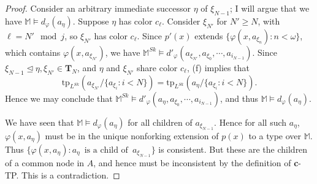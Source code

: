 \documentclass[10pt,a4paper]{amsart}
\newcommand{\bbM}{\mathbb{M}}
\newcommand{\tp}{\text{tp}}
\newcommand{\vphi}{\varphi}
\begin{document}
\begin{proof}
    Consider an arbitrary immediate successor $\eta$ of $\xi_{N-1}$; I will argue that we have $\bbM\models d_\vphi (a_\eta)$. Suppose $\eta$ has color $c_\ell$. Consider $\xi_{N'}$ for $N'\geq N$, with $\ell=N'\mod j$, so $\xi_{N'}$ has color $c_\ell$. Since $p'(x)$ extends $\{\vphi(x, a_{\xi_n})\colon n<\omega\}$, which contains $\vphi(x, a_{\xi_{N'}})$, we have $\bbM^{Sk}\models d'_\vphi(a_{\xi_{N'}},a_{\xi_0},\dotsm, a_{i_{N-1}})$. Since $\xi_{N-1}\trianglelefteq \eta, \xi_{N'}\in \textbf{T}_N$, and $\eta$ and $\xi_{N'}$ share color $c_\ell$, (f) implies that $$\tp_{L^{Sk}}(a_{\xi_{N'}}/\{a_{\xi_i}\colon i<N\})=\tp_{L^{Sk}}(a_{\eta}/\{a_{\xi_i}\colon i<N\}).$$
    Hence we may conclude that $\bbM^{Sk}\models d'_\vphi(a_\eta,a_{\xi_0},\dotsm, a_{i_{N-1}})$, and thus $\bbM\models d_\vphi(a_\eta)$. 
    

    We have seen that $\bbM\models d_\vphi(a_\eta)$ for all children of $a_{\xi_{N-1}}$. Hence for all such $a_\eta$, $\vphi(x,a_\eta)$ must be in the unique nonforking extension of $p(x)$ to a type over $\bbM$. Thus $\{\vphi(x, a_\eta)\colon a_\eta\enspace\text{is a child of}\enspace a_{\xi_{N-1}}\}$ is consistent. But these are the children of a common node in $A$, and hence must be inconsistent by the definition of \textbf{c}-TP. This is a contradiction. 
\end{proof}
\end{document}
